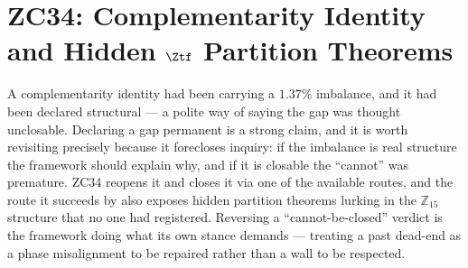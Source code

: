 \documentclass[12pt, a4paper]{article}
\begin{document}
\section{ZC34: Complementarity Identity and Hidden $\Ztf$ Partition Theorems}
\label{sec:zc34-complementarity}

A complementarity identity had been carrying a $1.37\%$ imbalance, and it had
been declared structural --- a polite way of saying the gap was thought
unclosable. Declaring a gap permanent is a strong claim, and it is worth
revisiting precisely because it forecloses inquiry: if the imbalance is real
structure the framework should explain why, and if it is closable the ``cannot''
was premature. ZC34 reopens it and closes it via one of the available routes,
and the route it succeeds by also exposes hidden partition theorems lurking in
the $\mathbb{Z}_{15}$ structure that no one had registered. Reversing a
``cannot-be-closed'' verdict is the framework doing what its own stance demands
--- treating a past dead-end as a phase misalignment to be repaired rather than a
wall to be respected.



\sloppy

\end{document}
